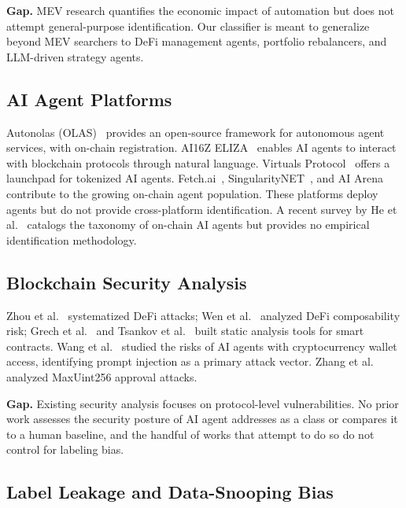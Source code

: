 \documentclass[sigconf,nonacm=false]{acmart}
\begin{document}
\textbf{Gap.} MEV research quantifies the economic impact of automation but does not attempt general-purpose identification. Our classifier is meant to generalize beyond MEV searchers to DeFi management agents, portfolio rebalancers, and LLM-driven strategy agents.

\subsection{AI Agent Platforms}

Autonolas (OLAS)~\cite{autonolas2023} provides an open-source framework for autonomous agent services, with on-chain registration. AI16Z ELIZA~\cite{eliza2024} enables AI agents to interact with blockchain protocols through natural language. Virtuals Protocol~\cite{virtuals2024} offers a launchpad for tokenized AI agents. Fetch.ai~\cite{fetchai2023}, SingularityNET~\cite{singularitynet2023}, and AI Arena~\cite{aiarena2024} contribute to the growing on-chain agent population. These platforms deploy agents but do not provide cross-platform identification. A recent survey by He et al.~\cite{he2026agentsurvey} catalogs the taxonomy of on-chain AI agents but provides no empirical identification methodology.

\subsection{Blockchain Security Analysis}

Zhou et al.~\cite{zhou2023sok} systematized DeFi attacks; Wen et al.~\cite{wen2023composability} analyzed DeFi composability risk; Grech et al.~\cite{grech2022madmax} and Tsankov et al.~\cite{tsankov2018securify} built static analysis tools for smart contracts. Wang et al.~\cite{wang2024airisks} studied the risks of AI agents with cryptocurrency wallet access, identifying prompt injection as a primary attack vector. Zhang et al.~\cite{zhang2024approval} analyzed MaxUint256 approval attacks.

\textbf{Gap.} Existing security analysis focuses on protocol-level vulnerabilities. No prior work assesses the security posture of AI agent addresses as a class or compares it to a human baseline, and the handful of works that attempt to do so do not control for labeling bias.

\subsection{Label Leakage and Data-Snooping Bias}
\end{document}
